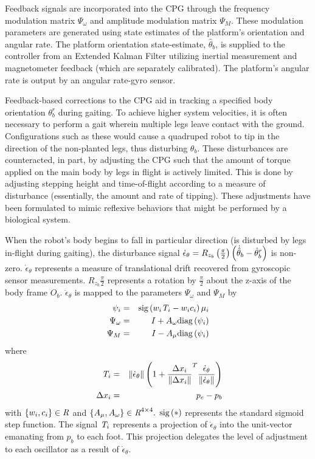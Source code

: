 			Feedback signals are incorporated into the CPG through the frequency modulation matrix $\Psi_{\omega}$ and amplitude modulation matrix $\Psi_{M}$. These modulation parameters are generated using state estimates of the platform's orientation and angular rate. The platform orientation state-estimate, $\hat{\theta}_{b}$, is supplied to the controller from an Extended Kalman Filter utilizing inertial measurement and magnetometer feedback (which are separately calibrated). The platform's angular rate is output by an angular rate-gyro sensor.

			Feedback-based corrections to the CPG aid in tracking a specified body orientation $\theta_{b}^{r}$ during gaiting. To achieve higher system velocities, it is often necessary to perform a gait wherein multiple legs leave contact with the ground. Configurations such as these would cause a quadruped robot to tip in the direction of the non-planted legs, thus disturbing $\theta_{b}$. These disturbances are counteracted, in part, by adjusting the CPG such that the amount of torque applied on the main body by legs in flight is actively limited. This is done by adjusting stepping height and time-of-flight according to a measure of disturbance (essentially, the amount and rate of tipping). These adjustments have been formulated to mimic reflexive behaviors that might be performed by a biological system.

			When the robot's body begins to fall in particular direction (\IE is disturbed by legs in-flight during gaiting), the disturbance signal $\dot{\epsilon}_{\theta} = {R}_{z_{b}}\left(\frac{\pi}{2}\right)\left(\dot{\hat{\theta}}_{b} - \dot{\theta}_{b}^{r}\right)$ is non-zero. $\dot{\epsilon}_{\theta}$ represents a measure of translational drift recovered from gyroscopic sensor measurements. ${R}_{z_{b}}{\frac{\pi}{2}}$ represents a rotation by $\frac{\pi}{2}$ about the z-axis of the body frame $O_{b}$. $\dot{\epsilon}_{\theta}$ is mapped to the parameters $\Psi_{\omega}$ and $\Psi_{M}$ by
				\begin{eqnarray}
					\psi_{i} 			&=& \text{sig}\left(  w_{i} \emph{T}_{i} - w_{i} c_{i} \right) {\mu}_{i} 	\nonumber\\
					\Psi_{\omega} 		&=& I + A_{\omega}\text{diag}\left( \psi_{i} \right) 						\nonumber\\
					\Psi_{M}			&=& I - A_{\mu} \text{diag}\left(  \psi_{i} \right) 
				\end{eqnarray}
			where
				\begin{eqnarray}
					\emph{T}_{i} 		&=& \left\lVert \dot{\epsilon}_{\theta} \right\rVert \left(1 + \frac{\Delta x_{i}}{\left\lVert\Delta x_{i}\right\rVert}^T  \frac{ \dot{\epsilon}_{\theta}  }{\left\lVert \dot{\epsilon}_{\theta}  \right\rVert} \right)	\nonumber\\\
					\Delta x_{i}		&=& {p}_{e} - {p}_{b}
				\end{eqnarray}
			with $\{w_{i}, c_{i}\} \in\emph{R}^{}$ and $\{A_{\mu}, A_{\omega}\}   \in\emph{R}^{4\times4}.$ $\text{sig}\left(*\right)$ represents the standard
			sigmoid step function. The signal $\emph{T}_{i}$ represents a projection of $\dot{\epsilon}_{\theta}$ into the unit-vector emanating from ${p}_{b}$ to each \Ith foot. This projection delegates the level of adjustment to each \Ith oscillator as a result of $\dot{\epsilon}_{\theta}$. 		

